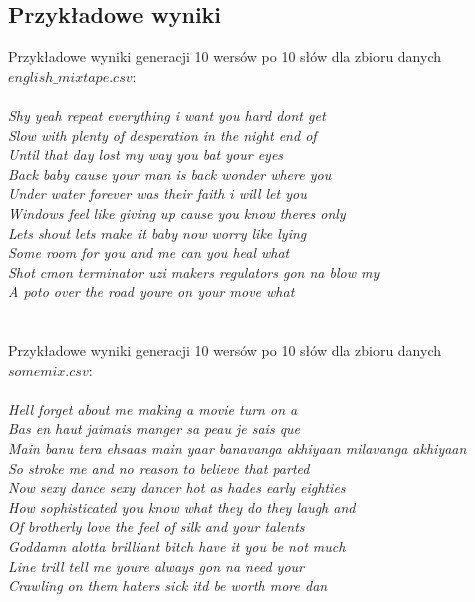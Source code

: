 \documentclass{article}
\begin{document}
\subsection{Przykładowe wyniki}
\newpage
\begin{center}
    Przykładowe wyniki generacji 10 wersów po 10 słów dla zbioru danych $english\_mixtape.csv$: \\
    \leavevmode\\
    \textsl{Shy yeah repeat everything i want you hard dont get \\
            Slow with plenty of desperation in the night end of \\
            Until that day lost my way you bat your eyes \\
            Back baby cause your man is back wonder where you \\
            Under water forever was their faith i will let you \\
            Windows feel like giving up cause you know theres only \\
            Lets shout lets make it baby now worry like lying \\
            Some room for you and me can you heal what \\
            Shot cmon terminator uzi makers regulators gon na blow my \\
            A poto over the road youre on your move what} \\
    \leavevmode\\\leavevmode\\
    Przykładowe wyniki generacji 10 wersów po 10 słów dla zbioru danych $somemix.csv$: \\
    \leavevmode\\
    \textsl{Hell forget about me making a movie turn on a \\
            Bas en haut jaimais manger sa peau je sais que \\
            Main banu tera ehsaas main yaar banavanga akhiyaan milavanga akhiyaan \\
            So stroke me and no reason to believe that parted \\
            Now sexy dance sexy dancer hot as hades early eighties \\
            How sophisticated you know what they do they laugh and \\
            Of brotherly love the feel of silk and your talents \\
            Goddamn alotta brilliant bitch have it you be not much \\
            Line trill tell me youre always gon na need your \\
            Crawling on them haters sick itd be worth more dan} \\
    \leavevmode\\\leavevmode\\
\end{center}
\newpage
\end{document}
